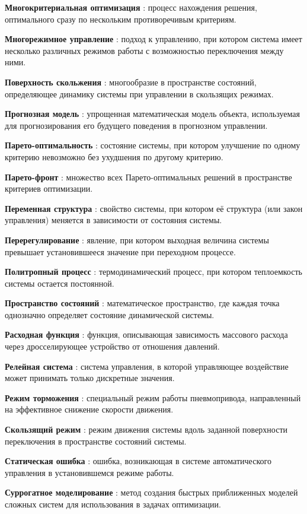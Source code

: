\textbf{Многокритериальная оптимизация} : процесс нахождения решения, оптимального сразу по нескольким противоречивым критериям.

\textbf{Многорежимное управление} : подход к управлению, при котором система имеет несколько различных режимов работы с возможностью переключения между ними.

\textbf{Поверхность скольжения} : многообразие в пространстве состояний, определяющее динамику системы при управлении в скользящих режимах.

\textbf{Прогнозная модель} : упрощенная математическая модель объекта, используемая для прогнозирования его будущего поведения в прогнозном управлении.

\textbf{Парето-оптимальность} : состояние системы, при котором улучшение по одному критерию невозможно без ухудшения по другому критерию.

\textbf{Парето-фронт} : множество всех Парето-оптимальных решений в пространстве критериев оптимизации.

\textbf{Переменная структура} : свойство системы, при котором её структура (или закон управления) меняется в зависимости от состояния системы.

\textbf{Перерегулирование} : явление, при котором выходная величина системы превышает установившееся значение при переходном процессе.

\textbf{Политропный процесс} : термодинамический процесс, при котором теплоемкость системы остается постоянной.

\textbf{Пространство состояний} : математическое пространство, где каждая точка однозначно определяет состояние динамической системы.

\textbf{Расходная функция} : функция, описывающая зависимость массового расхода через дросселирующее устройство от отношения давлений.

\textbf{Релейная система} : система управления, в которой управляющее воздействие может принимать только дискретные значения.

\textbf{Режим торможения} : специальный режим работы пневмопривода, направленный на эффективное снижение скорости движения.

\textbf{Скользящий режим} : режим движения системы вдоль заданной поверхности переключения в пространстве состояний системы.

\textbf{Статическая ошибка} : ошибка, возникающая в системе автоматического управления в установившемся режиме работы.

\textbf{Суррогатное моделирование} : метод создания быстрых приближенных моделей сложных систем для использования в задачах оптимизации.

